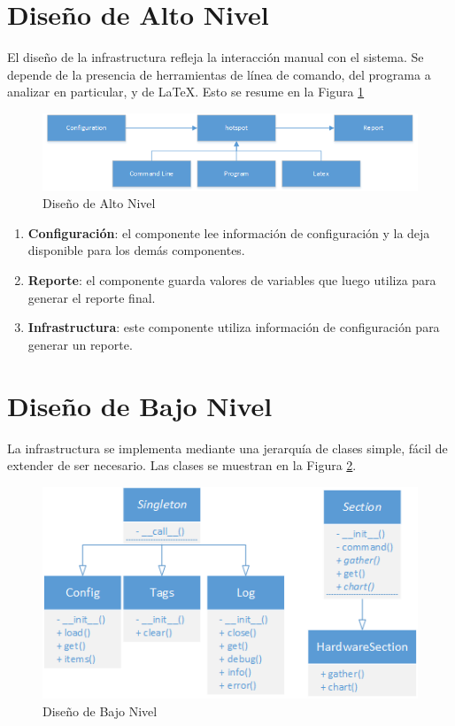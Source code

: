 \documentclass[a4paper]{report}
\begin{document}
\section{Diseño de Alto Nivel}

El diseño de la infrastructura refleja la interacción manual con el sistema. 
Se depende de la presencia de herramientas de línea de comando, del programa a analizar en particular, y de \LaTeX.
Esto se resume en la Figura \ref{fig:hotspot-hld}

\begin{figure}[H]
\begin{center}
\includegraphics[width=\textwidth]{hotspot-hld.png}
\caption{Diseño de Alto Nivel}
\label{fig:hotspot-hld}
\end{center}
\end{figure}

\begin{enumerate}
\item{\bf Configuración}: el componente lee información de configuración y la deja disponible para los demás componentes.
\item{\bf Reporte}: el componente guarda valores de variables que luego utiliza para generar el reporte final. 
\item{\bf Infrastructura}: este componente utiliza información de configuración para generar un reporte.
\end{enumerate}

\section{Diseño de Bajo Nivel}

La infrastructura se implementa mediante una jerarquía de clases simple, fácil de extender de ser necesario.
Las clases se muestran en la Figura \ref{fig:hotspot-lld}.

\begin{figure}[H]
\begin{center}
\includegraphics[width=\textwidth]{hotspot-lld.png}
\caption{Diseño de Bajo Nivel}
\label{fig:hotspot-lld}
\end{center}
\end{figure}
\end{document}
